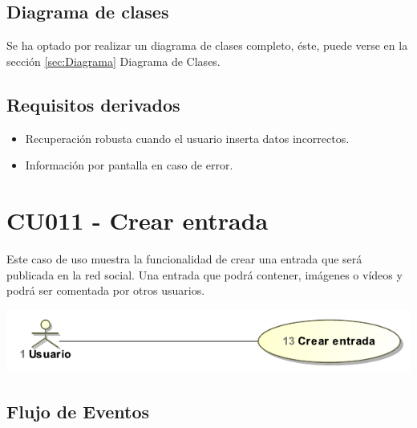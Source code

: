 \documentclass[12pt, a4paper, titlepage]{article}
\begin{document}
\subsection{Diagrama de clases}
Se ha optado por realizar un diagrama de clases completo, éste, puede verse en la sección \ref{sec:Diagrama} Diagrama de Clases.
\subsection{Requisitos derivados}

\begin{itemize}
	\item Recuperación robusta cuando el usuario inserta datos incorrectos.
	\item Información por pantalla en caso de error.
\end{itemize}

\section{CU011 - Crear entrada}


Este caso de uso muestra la funcionalidad de crear una entrada que será publicada en la red social. Una entrada que podrá contener, imágenes o vídeos y podrá ser comentada por otros usuarios.

\begin{center}
	\includegraphics{Imagenes/CrearEntradaCU.pdf}
\end{center}

\subsection{Flujo de Eventos}


\end{document}
